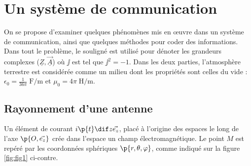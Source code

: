 \documentclass[a4paper,french,bookmarks]{article}
\begin{document}
    \renewcommand{\thesection}{\Roman{section}} 
    \renewcommand{\thesubsection}{\thesection.\Alph{subsection}}
    \renewcommand{\labelenumi}{\thesection.\arabic{enumi}.}
    \renewcommand*{\labelenumii}{\roman{enumii})}
    
    
    \section{Un système de communication}
    
    On se propose d'examiner quelques phénomènes mis en œuvre dans un système de communication, ainsi que quelques méthodes pour coder des informations. Dans tout le problème, le souligné est utilisé pour dénoter les grandeurs complexes ($\underline Z,\underline{\vec A}$) où $\jj$ est tel que $\jj^2 = -1$. Dans les deux parties, l'atmosphère terrestre est considérée comme un milieu dont les propriétés sont celles du vide : $\epsilon_0 = \frac{1}{36\pi}\;\unit{\farad\per\meter}$ et $\mu_0 = 4\pi\;\unit{\henry\per\meter}$.
    
    \subsection{Rayonnement d'une antenne}
    
    \begin{minipage}{0.5\linewidth}
        \begin{center}
    	    \label{fig:fig1}
	    \end{center}
    \end{minipage}
    \begin{minipage}{0.5\linewidth}
        Un élément de courant $i\p{t}\dif z \vec{e_z}$, placé à l'origine des espaces le long de l'axe $\p{O, \vec{e_z}}$ crée dans l'espace un champ électromagnétique. Le point $M$ est repéré par les coordonnées sphériques $\p{r, \theta, \varphi}$, comme indiqué sur la figure \ref{fig:fig1} ci-contre.
    \end{minipage}
    
\end{document}
